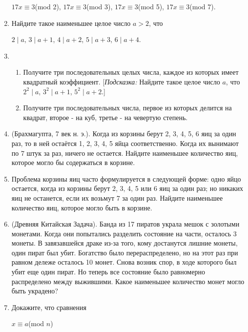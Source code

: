 \documentclass[11pt]{article}
\begin{document}
\begin{enumerate}
	\begin{center}
		$17x \equiv 3$(mod 2), $17x \equiv 3$(mod 3), $17x \equiv 3$(mod 5), $17x \equiv 3$(mod 7). 
	\end{center}
	\item Найдите такое наименьшее целое число $a > 2$, что
	\begin{center}
		$2\mid a$, $3\mid a + 1$, $4\mid a +2$, $5\mid a +3$, $6\mid a + 4$.
	\end{center}
	\item
		\begin{enumerate} 
			\item Получите три последовательных целых числа, каждое из которых имеет квадратный коэффициент. [\textit{Подсказка:} Найдите такое целое число $a$, что $2^{2}\mid a$, $3^{2}\mid a + 1$, $5^{2}\mid a + 2$.]
			\item Получите три последовательных числа, первое из которых делится на квадрат, второе - на куб, третье - на чевертую степень.
		\end{enumerate}
	\item (Брахмагупта, 7 век н. э.). Когда из корзины берут 2, 3, 4, 5, 6 яиц за один раз, то в ней остаётся 1, 2, 3, 4, 5 яйца соответственно. Когда их вынимают по 7 штук за раз, ничего не остается. Найдите наименьшее количество яиц, которое могло бы содержаться в корзине.
	\item Проблема корзины яиц часто формулируется в следующей форме: одно яйцо остается, когда из корзины берут 2, 3, 4, 5 или 6 яиц за один раз; но никаких яиц не останется, если их возьмут 7 за один раз. Найдите наименьшее количество яиц, которое могло быть в корзине.
	\item (Древняя Китайская Задача). Банда из 17 пиратов украла мешок с золотыми монетами. Когда они попытались разделить состояние на части, осталось 3 монеты. В завязавшейся драке из-за того, кому достанутся лишние монеты, один пират был убит. Богатство было перераспределено, но на этот раз при равном дележе осталось 10 монет. Снова возник спор, в ходе которого был убит еще один пират. Но теперь все состояние было равномерно распределено между выжившими. Какое наименьшее количество монет могло быть украдено?
	\item Докажите, что сравнения
	\begin{center}
		\begin{minipage}{0.2\textwidth}
			\begin{flushleft}
				$x \equiv a$(mod $n$)
			\end{flushleft}
		\end{minipage}

\end{center}
\end{enumerate}
\end{document}
